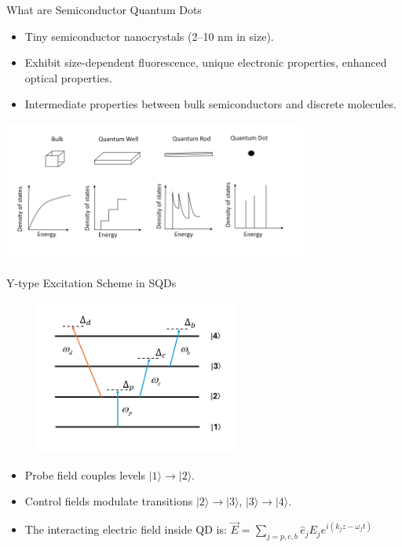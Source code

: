 \documentclass[12pt,aspectratio=1610]{beamer}
\begin{document}
\begin{frame}{What are Semiconductor Quantum Dots}
  \begin{itemize}
    \item Tiny semiconductor nanocrystals (2--10 nm in size).
    \item Exhibit size-dependent fluorescence, unique electronic properties, enhanced optical properties.
    \item Intermediate properties between bulk semiconductors and discrete molecules.
  \end{itemize}
  \vspace{15pt}
  \centering
  \includegraphics[width=0.75\textwidth]{Assets/DoSvsE.PNG}
\end{frame}

\begin{frame}{Y-type Excitation Scheme in SQDs}
  \vspace{-20pt}
  \begin{figure}
    \includegraphics[width=0.6\textwidth]{Assets/Y-type.png}
  \end{figure}
  \vspace{-12pt}
  \begin{itemize}
    \item Probe field couples levels $|1\rangle \rightarrow |2\rangle$.
    \item Control fields modulate transitions $|2\rangle \rightarrow |3\rangle$, $|3\rangle \rightarrow |4\rangle$.
    \item The interacting electric field inside QD is: \( \vec{E}=\sum_{j=p,c,b}\hat{e}_j E_j e^{i(k_j z-\omega_j t)} \)
  \end{itemize}
\end{frame}
\end{document}
